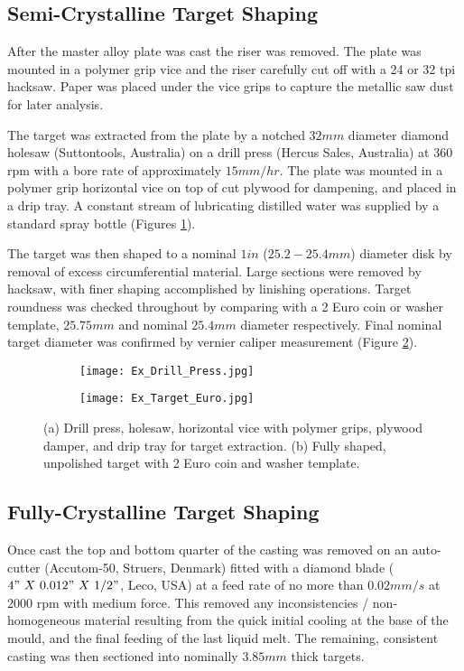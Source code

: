 \subsection{Semi-Crystalline Target Shaping}
After the master alloy plate was cast the riser was removed. The plate was mounted in a polymer grip vice and the riser carefully cut off with a 24 or 32 \acrshort{tpi} hacksaw. Paper was placed under the vice grips to capture the metallic saw dust for later analysis.

The target was extracted from the plate by a notched $32 mm$ diameter diamond holesaw (Suttontools, Australia) on a drill press (Hercus Sales, Australia) at 360 \acrshort{rpm} with a bore rate of approximately $15 mm/hr$. The plate was mounted in a polymer grip horizontal vice on top of cut plywood for dampening, and placed in a drip tray. A constant stream of lubricating distilled water was supplied by a standard spray bottle (Figures \ref{fig:DrillPress}).

The target was then shaped to a nominal $1 in$ ($25.2 - 25.4 mm$) diameter disk by removal of excess circumferential material. Large sections were removed by hacksaw, with finer shaping accomplished by linishing operations. Target roundness was checked throughout by comparing with a 2 Euro coin or washer template, $25.75 mm$ and nominal $25.4 mm$ diameter respectively. Final nominal target diameter was confirmed by vernier caliper measurement (Figure \ref{fig:TargetEuro}). 

\begin{figure}[htbp]
	\centering
	\begin{subfigure}[htbp]{0.30\textwidth}
		\texttt{[image: Ex\_Drill\_Press.jpg]}
		\caption{}
		\label{fig:DrillPress}
	\end{subfigure}
	\begin{subfigure}[htbp]{0.38\textwidth}
		\texttt{[image: Ex\_Target\_Euro.jpg]}
		\caption{}
		\label{fig:TargetEuro}
	\end{subfigure}
	\caption{(a) Drill press, holesaw, horizontal vice with polymer grips, plywood damper, and drip tray for target extraction. (b) Fully shaped, unpolished target with 2 Euro coin and washer template.}%
	\label{fig:ShapingEquipment}
\end{figure}

\subsection{Fully-Crystalline Target Shaping}
Once cast the top and bottom quarter of the casting was removed on an auto-cutter (Accutom-50, Struers, Denmark) fitted with a diamond blade ($4"~ X~ 0.012"~ X~ 1/2"$, Leco, USA) at a feed rate of no more than $0.02 mm/s$ at $2000$ \acrshort{rpm} with medium force. This removed any inconsistencies / non-homogeneous material resulting from the quick initial cooling at the base of the mould, and the final feeding of the last liquid melt. The remaining, consistent casting was then sectioned into nominally $3.85 mm$ thick targets.

